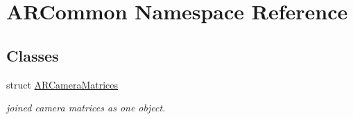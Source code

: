 \hypertarget{namespace_a_r_common}{}\section{A\+R\+Common Namespace Reference}
\label{namespace_a_r_common}
\subsection*{Classes}
\begin{DoxyCompactItemize}
\item 
struct \mbox{\hyperlink{struct_a_r_common_1_1_a_r_camera_matrices}{A\+R\+Camera\+Matrices}}
\begin{DoxyCompactList}\small\item\em joined camera matrices as one object. \end{DoxyCompactList}\end{DoxyCompactItemize}
